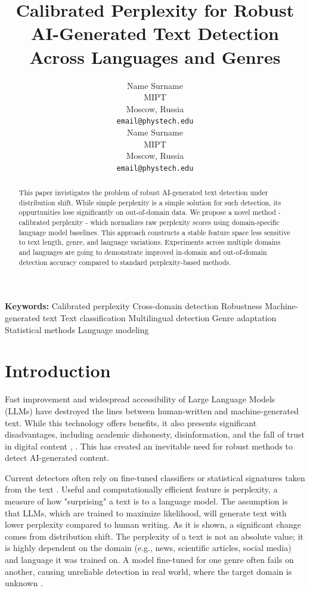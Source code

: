 \documentclass{article}
\title{Calibrated Perplexity for Robust AI-Generated Text Detection Across Languages and Genres}
\author{
  Name Surname\\
  MIPT\\
  Moscow, Russia\\
  \texttt{email@phystech.edu}\\
  \And
  Name Surname\\
  MIPT\\
  Moscow, Russia\\
  \texttt{email@phystech.edu}\\
}
\begin{document}
\maketitle

\begin{abstract}
    This paper invistigates the problem of robust AI-generated text detection under distribution shift. While simple perplexity is a simple solution for such detection, its oppurtunities lose significantly on out-of-domain data. We propose a novel method - calibrated perplexity - which normalizes raw perplexity scores using domain-specific language model baselines. This approach constructs a stable feature space less sensitive to text length, genre, and language variations. Experiments across multiple domains and languages are going to demonstrate improved in-domain and out-of-domain detection accuracy compared to standard perplexity-based methods.
\end{abstract}

\textbf{Keywords:} Calibrated perplexity
Cross-domain detection
Robustness
Machine-generated text
Text classification
Multilingual detection
Genre adaptation
Statistical methods
Language modeling

\section{Introduction}\label{sec:intro}

Fast improvement and widespread accessibility of Large Language Models (LLMs) have destroyed the lines between human-written and machine-generated text. While this technology offers benefits, it also presents significant disadvantages, including academic dishonesty, disinformation, and the fall of trust in digital content \cite{xu2024detecting}, \cite{hans2024spotting}. This has created an inevitable need for robust methods to detect AI-generated content.

Current detectors often rely on fine-tuned classifiers or statistical signatures taken from the text \cite{gehrmann2019gltr}. Useful and computationally efficient feature is perplexity, a measure of how "surprising" a text is to a language model. The assumption is that LLMs, which are trained to maximize likelihood, will generate text with lower perplexity compared to human writing. As it is shown, a significant change comes from distribution shift. The perplexity of a text is not an absolute value; it is highly dependent on the domain (e.g., news, scientific articles, social media) and language it was trained on. A model fine-tuned for one genre often fails on another, causing unreliable detection in real world, where the target domain is unknown \cite{bakhteev2022automatic}.
\end{document}
